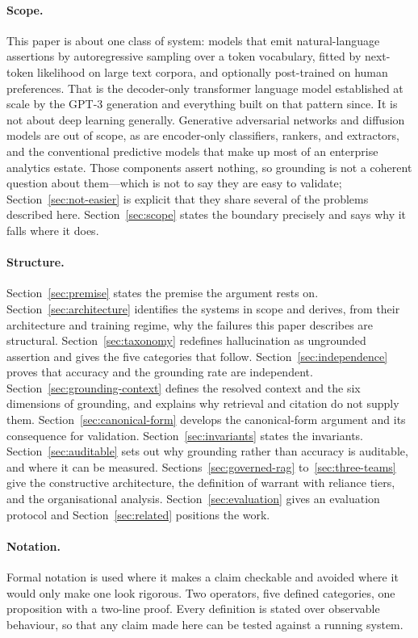 \documentclass[11pt]{article}
\theoremstyle{plain}
\theoremstyle{definition}
\begin{document}
\paragraph{Scope.} This paper is about one class of system: models that emit
natural-language assertions by autoregressive sampling over a token vocabulary,
fitted by next-token likelihood on large text corpora, and optionally post-trained
on human preferences. That is the decoder-only transformer language model
established at scale by the GPT-3 generation and everything built on that pattern
since. It is not about deep learning generally. Generative adversarial networks and
diffusion models are out of scope, as are encoder-only classifiers, rankers, and
extractors, and the conventional predictive models that make up most of an
enterprise analytics estate. Those components assert nothing, so grounding is not a
coherent question about them---which is not to say they are easy to validate;
Section~\ref{sec:not-easier} is explicit that they share several of the problems
described here. Section~\ref{sec:scope} states the boundary
precisely and says why it falls where it does.

\paragraph{Structure.} Section~\ref{sec:premise} states the premise the argument
rests on. Section~\ref{sec:architecture} identifies the systems in scope and
derives, from their architecture and training regime, why the failures this paper
describes are structural. Section~\ref{sec:taxonomy} redefines
hallucination as ungrounded assertion and gives the five categories that follow.
Section~\ref{sec:independence} proves that accuracy and the grounding rate are
independent.
Section~\ref{sec:grounding-context} defines the resolved context and the six
dimensions of grounding, and explains why retrieval and citation do not supply
them. Section~\ref{sec:canonical-form} develops the canonical-form argument and its
consequence for validation. Section~\ref{sec:invariants} states the invariants.
Section~\ref{sec:auditable} sets out why grounding rather than accuracy is
auditable, and where it can be measured. Sections~\ref{sec:governed-rag}
to~\ref{sec:three-teams} give the constructive architecture, the definition of
warrant with reliance tiers, and the organisational analysis.
Section~\ref{sec:evaluation} gives an evaluation protocol and
Section~\ref{sec:related} positions the work.

\paragraph{Notation.} Formal notation is used where it makes a claim checkable
and avoided where it would only make one look rigorous. Two operators, five
defined categories, one proposition with a two-line proof. Every definition is
stated over observable behaviour, so that any claim made here can be tested
against a running system.
\end{document}
